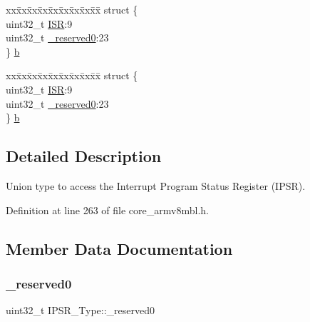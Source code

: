 \begin{DoxyCompactItemize}
\begin{tabbing}
\end{tabbing}\item 
\begin{tabbing}
xx\=xx\=xx\=xx\=xx\=xx\=xx\=xx\=xx\=\kill
struct \{\\
\>uint32\_t \hyperlink{union_i_p_s_r___type_ab46e5f1b2f4d17cfb9aca4fffcbb2fa5}{ISR}:9\\
\>uint32\_t \hyperlink{union_i_p_s_r___type_ad2eb0a06de4f03f58874a727716aa9aa}{\_reserved0}:23\\
\} \hyperlink{union_i_p_s_r___type_acb0a45435ddd0100d415cf6b8cb8c1e7}{b}\\

\end{tabbing}\item 
\begin{tabbing}
xx\=xx\=xx\=xx\=xx\=xx\=xx\=xx\=xx\=\kill
struct \{\\
\>uint32\_t \hyperlink{union_i_p_s_r___type_ab46e5f1b2f4d17cfb9aca4fffcbb2fa5}{ISR}:9\\
\>uint32\_t \hyperlink{union_i_p_s_r___type_ad2eb0a06de4f03f58874a727716aa9aa}{\_reserved0}:23\\
\} \hyperlink{union_i_p_s_r___type_a358d44ebcf10864f13b21b3b6e4a35bc}{b}\\

\end{tabbing}\end{DoxyCompactItemize}


\subsection{Detailed Description}
Union type to access the Interrupt Program Status Register (I\+P\+SR). 

Definition at line 263 of file core\+\_\+armv8mbl.\+h.



\subsection{Member Data Documentation}
\mbox{\label{union_i_p_s_r___type_ad2eb0a06de4f03f58874a727716aa9aa}} 
\subsubsection{\texorpdfstring{\+\_\+reserved0}{\_reserved0}}
{\footnotesize\ttfamily uint32\+\_\+t I\+P\+S\+R\+\_\+\+Type\+::\+\_\+reserved0}

